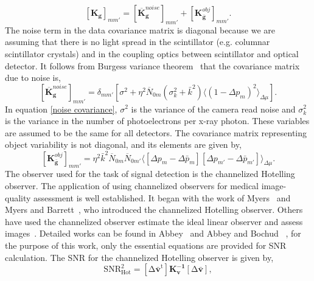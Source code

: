 %
\begin{equation}
\label{gen covariance2}
[\mathbf{K_g}]_{mm'} = [\overline{\mathbf{K}}_\mathbf{g}^{noise}]_{mm'}+[\mathbf{K}_{\mathbf{\bar{g}}}^{obj}]_{mm'}.
\end{equation}
%
The noise term in the data covariance matrix is diagonal because we are assuming that there is no light spread in the scintillator (e.g. columnar scintillator crystals) and in the coupling optics between scintillator and optical detector.  It follows from Burgess variance theorem~\citep{Burgess1959, Barrett2004} that the covariance matrix due to noise is,
%
\begin{equation}
\label{noise covariance}
[\overline{\mathbf{K}}_\mathbf{g}^{noise}]_{mm'}= \delta_{mm'}[\sigma^2 + \eta^2 \overline{N}_{0m} (\sigma_k^2 + \bar{k}^2)\langle(1-\Delta p_m)^2 \rangle_{\Delta\mu}].
\end{equation}
%
In equation \ref{noise covariance}, $\sigma^2$ is the variance of the camera read noise and $\sigma_k^2$ is the variance in the number of photoelectrons per x-ray photon.  These variables are assumed to be the same for all detectors.
The covariance matrix representing object variability is not diagonal, and its elements are given by,
%
\begin{equation}
\label{object covariance}
[\mathbf{K}_{\mathbf{\bar{g}}}^{obj}]_{mm'}=\eta^2\bar{k}^2\overline{N}_{0m}\overline{N}_{0m'} \langle[\Delta p_m - \Delta \bar{p}_m][\Delta p_{m'}-\Delta \bar{p}_{m'}]\rangle _{\Delta \mu}.
\end{equation}
%
The observer used for the task of signal detection is the channelized Hotelling observer.  The application of using channelized observers for medical image-quality assessment is well established.  It began with the work of Myers~\citep{MyersThesis} and Myers and Barrett~\citep{Myers1987}, who introduced the channelized Hotelling observer.  Others have used the channelized observer estimate the ideal linear observer and assess images~\citep{Gallas2003,Abbey2000, Abbey2001}.  Detailed works can be found in Abbey~\citep{AbbeyThesis} and Abbey and Bochud~\citep{Abbey2000} , for the purpose of this work, only the essential equations are provided for SNR calculation.
The SNR for the channelized Hotelling observer is given by,
%
\begin{equation}
\label{SNR hot}
\mathrm{SNR^2_{Hot} = [\Delta \mathbf{\bar{v}}^t]\mathbf{K_v^{-1}}[\Delta \mathbf{\bar{v}}]},
\end{equation}
%
